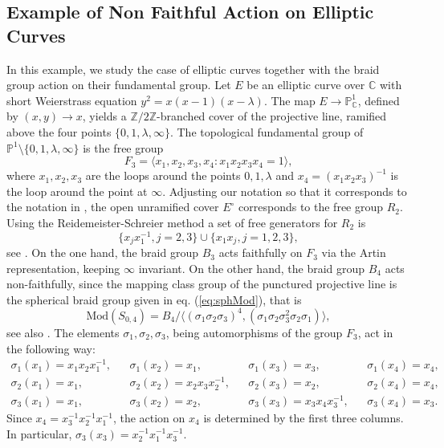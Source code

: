 \documentclass[10pt]{amsart}
\theoremstyle{definition}
\begin{document}
\subsection{Example of Non Faithful Action on Elliptic Curves} \label{sec:nonfaithfulelliptic}
In this example, we study the case of elliptic curves together with the braid group action on their fundamental group. Let $E$ be an elliptic curve over $\mathbb{C}$ with short Weierstrass equation $y^2=x(x-1)(x-\lambda)$. The map $E\rightarrow \mathbb{P}^1_\mathbb{C}$, defined by $(x,y)\rightarrow x$, yields a $\mathbb{Z}/2\mathbb{Z}$-branched cover of the projective line, ramified above the four points $\{0,1,\lambda,\infty\}$. 
The topological fundamental group of $\mathbb{P}^1 \setminus \{0,1,\lambda, \infty\}$ is the free group
\[
  F_3=\langle x_1,x_2,x_3,x_4 : x_1x_2x_3x_4=1 \rangle,
\]
where $x_1, x_2, x_3$ are the loops around the points $0,1,\lambda$ and $x_4=(x_1x_2x_3)^{-1}$ is the loop around the point at $\infty$. Adjusting our notation so that it corresponds to the notation in \cite{MR4117575}, the open unramified cover $E^\circ$ corresponds to the free group $R_2$. Using the Reidemeister-Schreier method \cite{bogoGrp} a set of free generators for $R_2$ is
\[
  \{x_jx_1^{-1}, j=2,3\} \cup    
  \{x_1x_j, j=1,2,3\}, 
\]
see \cite[Lemma 13]{MR4117575}. On the one hand, the braid group $B_3$ acts faithfully on $F_3$ via the Artin representation, keeping $\infty$ invariant. On the other hand, the braid group $B_4$ acts non-faithfully, since the mapping class group of the punctured projective line is the spherical braid group given in eq. (\ref{eq:sphMod}), that is 
\[
  \mathrm{Mod}(S_{0,4})=B_4/
  \langle 
  (\sigma_1 \sigma_2 \sigma_3)^4, 
  (\sigma_1 \sigma_2 \sigma_3^2 \sigma_2 \sigma_1)
  \rangle,
\] see also \cite[Remark 3]{MR4117575}. The elements $\sigma_1, \sigma_2, \sigma_3$, being automorphisms of the group $F_3$, act in the following way:
\begin{align*}
\sigma_1(x_1)=x_1x_2 x_1^{-1},&&
\sigma_1(x_2)=x_1,&&
\sigma_1(x_3)=x_3,&& \sigma_1(x_4)=x_4,
\\ 
\sigma_2(x_1)=x_1,&&
\sigma_2(x_2)=x_2x_3x_2^{-1},&&
\sigma_2(x_3)=x_2,
&& \sigma_2(x_4)=x_4,
\\ 
\sigma_3(x_1)=x_1,&&
\sigma_3(x_2)=x_2,&&
\sigma_3(x_3)=x_3x_4x_3^{-1},&& 
\sigma_3(x_4)=x_3.
\end{align*}
Since $x_4 = x_3^{-1}x_2^{-1}x_1^{-1}$, the action on $x_4$ is determined by the first three columns. In particular, $\sigma_3(x_3) = x_2^{-1}x_1^{-1}x_3^{-1}$.
\end{document}
